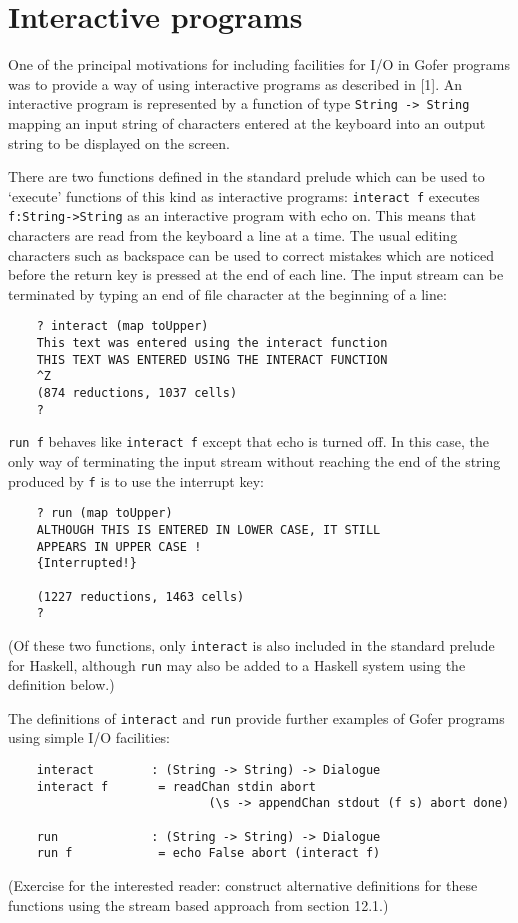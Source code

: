 \section{Interactive programs}
One of the principal motivations for including facilities  for  I/O  in
Gofer programs was to provide a way of using  interactive  programs  as
described in [1].  An interactive program is represented by a  function
of type \verb"String -> String" mapping an input string of characters  entered
at the keyboard into an output string to be displayed on the screen.

There are two functions defined in the standard prelude  which  can  be
used to `execute' functions of this kind as interactive programs:
\BI
\IT  \verb"interact f" executes 
     \verb"f:String->String" as an interactive  program
     with echo on.  This  means  that  characters  are  read  from  the
     keyboard a line at a time.  The usual editing characters  such  as
     backspace can be used to correct mistakes which are noticed before
     the return key is pressed at the end  of  each  line.   The  input
     stream can be terminated by typing an end of file character at the
     beginning of a line:
\begin{verbatim}
    ? interact (map toUpper)
    This text was entered using the interact function
    THIS TEXT WAS ENTERED USING THE INTERACT FUNCTION
    ^Z
    (874 reductions, 1037 cells)
    ?
\end{verbatim}
\IT  \verb"run f" behaves like 
     \verb"interact f" except that echo is turned  off.
     In this case, the only way of terminating the input stream without
     reaching the end of the string produced  by  \verb"f"  is  to  use  the
     interrupt key:
\begin{verbatim}
    ? run (map toUpper)     
    ALTHOUGH THIS IS ENTERED IN LOWER CASE, IT STILL
    APPEARS IN UPPER CASE !
    {Interrupted!}

    (1227 reductions, 1463 cells)
    ?
\end{verbatim}
\EI
(Of these two functions, only \verb"interact" is also included in the
standard prelude for Haskell, although \verb"run" may also  be  added  to  a
Haskell system using the definition below.)

The definitions of \verb"interact" and \verb"run"  
provide  further  examples  of
Gofer programs using simple I/O facilities:
\begin{verbatim}
    interact        : (String -> String) -> Dialogue
    interact f       = readChan stdin abort
                            (\s -> appendChan stdout (f s) abort done)
 
    run             : (String -> String) -> Dialogue
    run f            = echo False abort (interact f)
\end{verbatim} 
(Exercise for the interested reader:  construct alternative definitions
for these functions using the stream based approach from section 12.1.)


